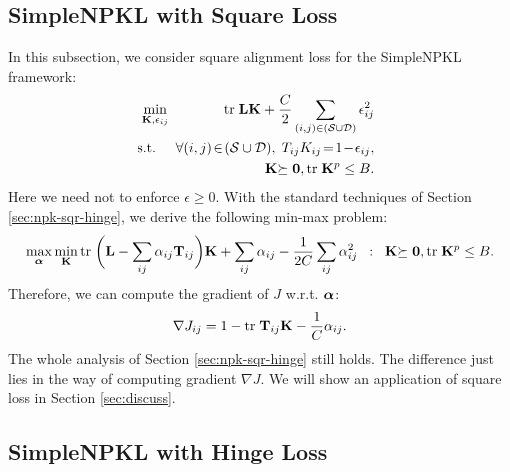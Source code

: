 \subsection {SimpleNPKL with Square Loss}

In this subsection, we consider square alignment loss for the SimpleNPKL framework:
\begin{eqnarray}
\!& \!\min_{\K, \epsilon_{ij}}\!&\!\tr \L\K + \frac{C}{2}\sum_{(i,j)\in(\SS\cup\DD)}\epsilon_{ij}^2  \nonumber\\%
\!\!&\!\!\mbox{s.t.}\!\!&\!\!\forall (i,j)\!\in \!(\SS\cup\DD),
                                 \; T_{ij}K_{ij}\! =\! 1 \!- \!\epsilon_{ij}, \nonumber\\
\!&\!\!  &\K\psd, \tr \K^p \leq B.
\nonumber
\end{eqnarray}
Here we need not to enforce $\epsilon \geq 0$. With the standard techniques of Section
\ref{sec:npk-sqr-hinge}, we derive the following min-max problem:
\begin{eqnarray}
\max_{{\boldsymbol{\alpha}}}\min_{\bf K} {\mbox{tr}\;}\bigg({\bf L}-\sum_{ij} {\alpha}_{ij}{\bf T}_{ij}   \bigg) {\bf K} + \sum_{ij}{\alpha}_{ij} - \frac{1}{2C}\sum_{ij}{\alpha}_{ij}^2\;\;:\;\;{\bf K}{\succeq{\bf 0}},{\mbox{tr}\;}{\bf K}^p\leq B.\nonumber
\end{eqnarray}
Therefore, we can compute the gradient of $J$ w.r.t. ${\boldsymbol{\alpha}}$:
\[
\nabla J_{ij} = 1 - {\mbox{tr}\;} {\bf T}_{ij}{\bf K}-\frac{1}{C}{\alpha}_{ij} .
\]
The whole analysis of Section \ref{sec:npk-sqr-hinge} still holds. The difference just
lies in the way of computing gradient $\nabla J$. We will show an application of square loss
in Section \ref{sec:discuss}.

\subsection {SimpleNPKL with Hinge Loss}

